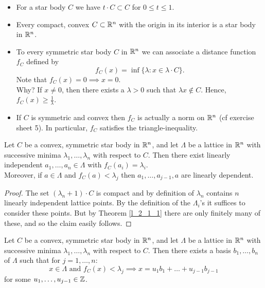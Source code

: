 \documentclass[NumTh.tex]{subfiles}
\begin{document}

\begin{rem}
  \begin{itemize}
    \item For a star body $C$ we have $t \cdot C \subset C$ for $0 \leq t \leq 1$.
    \item Every compact, convex $C \subset \mathbb{R}^n$ with the origin in its interior is a star body in $\mathbb{R}^n$.
    \item To every symmetric star body $C$ in $\mathbb{R}^n$ we can associate a distance function $f_C$ defined by
    \[ f_C(x) = \inf \{ \lambda: x \in \lambda \cdot C \} \text{.} \]
    Note that $f_C(x) = 0 \implies x =0$. \\
    Why? If $x \neq 0$, then there exists a $\lambda > 0$ such that $\lambda x \nin C$.
    Hence, $f_C(x) \geq \frac{1}{\lambda}$.
    \item If $C$ is symmetric and convex then $f_C$ is actually a norm on $\mathbb{R}^n$ (cf exercise sheet 5).
    In particular, $f_C$ satisfies the triangle-inequality.
  \end{itemize}
\end{rem}

\begin{lemma}\label{l_2_3_3}
  Let $C$ be a convex, symmetric star body in $\mathbb{R}^n$, and let $\Lambda$ be a lattice in $\mathbb{R}^n$ with successive minima $\lambda_1,\dots,\lambda_n$ with respect to $C$.
  Then there exist linearly independent $a_1,\dots,a_n \in \Lambda$ with $f_C(a_i) =  \lambda_i$.\\
  Moreover, if $a \in \Lambda$ and $f_C(a) < \lambda_j$ then $a_1,\dots,a_{j-1},a$ are linearly dependent.
\end{lemma}

\begin{proof}
  The set $(\lambda_n +1) \cdot C$ is compact and by definition of $\lambda_n$ contains $n$ linearly independent lattice points.
  By the definition of the $\Lambda_i$'s it suffices to consider these points.
  But by Theorem \ref{l_2_1_1} there are only finitely many of these, and so the claim easily follows.
\end{proof}

\begin{cor}\label{cor_2_3_4}
  Let $C$ be a convex, symmetric star body in $\mathbb{R}^n$, and let $\Lambda$ be a lattice in $\mathbb{R}^n$ with successive minima $\lambda_1,\dots,\lambda_n$ with respect to $C$.
  Then there exists a basis $b_1,\dots,b_n$ of $\Lambda$ such that for $j = 1,\dots,n$: 
  \[x \in \Lambda \text{ and } f_C(x) < \lambda_j \implies x = u_1 b_1 + \dots + u_{j-1} b_{j-1} \] 
  for some $u_1,\dots,u_{j-1} \in \mathbb{Z}$.
\end{cor}
\end{document}
